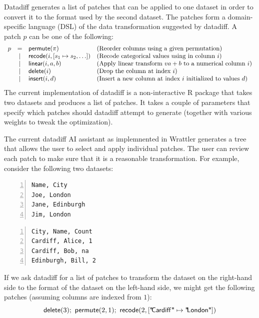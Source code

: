 \documentclass{article}
\begin{document}
Datadiff generates a list of patches that can be applied to one dataset in order to convert it to the
format used by the second dataset. The patches form a domain-specific language (DSL) of the 
data transformation suggested by datadiff. A patch $p$ can be one of the following:
%
\begin{equation*}
\begin{array}{lcll}
p &=& \textnormal{\sffamily permute}(\pi) &\textnormal{(Reorder columns using a given permutation)}\\
  &|& \textnormal{\sffamily recode}(i, [s_1\mapsto s_2, \ldots]) &\textnormal{(Recode categorical values using in column $i$)}\\
  &|& \textnormal{\sffamily linear}(i, a, b)&\textnormal{(Apply linear transform $va+b$ to a numerical column $i$)}\\
  &|& \textnormal{\sffamily delete}(i)&\textnormal{(Drop the column at index $i$)}\\
  &|& \textnormal{\sffamily insert}(i, d)&\textnormal{(Insert a new column at index $i$ initialized to values $d$)}
\end{array}
\end{equation*}
%
The current implementation of datadiff is a non-interactive R package that takes two datasets
and produces a list of patches. It takes a couple of parameters that specify which patches should
datadiff attempt to generate (together with various weights to tweak the optimization).

The current datadiff AI assistant as implemnented in Wrattler generates a tree that allows the
user to select and apply individual patches. The user can review each patch to make sure that it
is a reasonable transformation. For example, consider the following two datasets:

\vspace{0.5em}
\begin{minipage}[t]{0.5\textwidth}
\begin{Verbatim}[numbers=left,xleftmargin=3mm]
Name, City
Joe, London
Jane, Edinburgh
Jim, London
\end{Verbatim}
\end{minipage}
\begin{minipage}[t]{0.5\textwidth}
\begin{Verbatim}[numbers=left,xleftmargin=3mm]
City, Name, Count
Cardiff, Alice, 1
Cardiff, Bob, na
Edinburgh, Bill, 2
\end{Verbatim}
\end{minipage}
\vspace{1em}

\noindent
If we ask datadiff for a list of patches to transform the dataset on the right-hand side
to the format of the dataset on the left-hand side, we might get the following patches
(assuming columns are indexed from $1$):
%
\[
\textnormal{\sffamily delete}(3);~ \textnormal{\sffamily permute}(2,1);~ \textnormal{\sffamily recode}(2, [\textnormal{\sffamily "\hspace{-0.2em}Cardiff\hspace{0.1em}"}\mapsto\textnormal{\sffamily "\hspace{-0.2em}London"}])
\]
\end{document}
